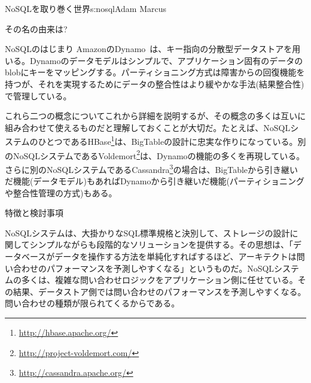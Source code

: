 \begin{aosachapter}{NoSQLを取り巻く世界}{s:nosql}{Adam Marcus}
\begin{aosasect1}{その名の由来は?}
\begin{aosasect2}{NoSQLのはじまり}
AmazonのDynamo~\cite{bib:amazon:dynamo}は、キー指向の分散型データストアを用いる。Dynamoのデータモデルはシンプルで、アプリケーション固有のデータのblobにキーをマッピングする。パーティショニング方式は障害からの回復機能を持つが、それを実現するためにデータの整合性はより緩やかな手法(結果整合性)で管理している。

これら二つの概念についてこれから詳細を説明するが、その概念の多くは互いに組み合わせて使えるものだと理解しておくことが大切だ。たとえば、NoSQLシステムのひとつであるHBase\footnote{\url{http://hbase.apache.org/}}は、BigTableの設計に忠実な作りになっている。別のNoSQLシステムであるVoldemort\footnote{\url{http://project-voldemort.com/}}は、Dynamoの機能の多くを再現している。さらに別のNoSQLシステムであるCassandra\footnote{\url{http://cassandra.apache.org/}}の場合は、BigTableから引き継いだ機能(データモデル)もあればDynamoから引き継いだ機能(パーティショニングや整合性管理の方式)もある。

\end{aosasect2}

\begin{aosasect2}{特徴と検討事項}

NoSQLシステムは、大掛かりなSQL標準規格と決別して、ストレージの設計に関してシンプルながらも段階的なソリューションを提供する。その思想は、「データベースがデータを操作する方法を単純化すればするほど、アーキテクトは問い合わせのパフォーマンスを予測しやすくなる」というものだ。NoSQLシステムの多くは、複雑な問い合わせロジックをアプリケーション側に任せている。その結果、データストア側では問い合わせのパフォーマンスを予測しやすくなる。問い合わせの種類が限られてくるからである。


\end{aosasect2}
\end{aosasect1}
\end{aosachapter}
